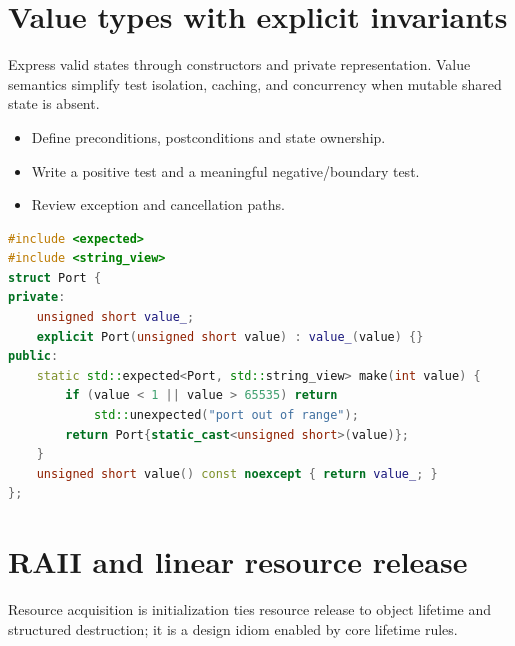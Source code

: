 \documentclass[11pt]{article}
\begin{document}
\section{Value types with explicit invariants}
Express valid states through constructors and private representation. Value semantics simplify test isolation, caching, and concurrency when mutable shared state is absent.

\begin{itemize}[leftmargin=*,itemsep=1pt,topsep=3pt]
\item Define preconditions, postconditions and state ownership.
\item Write a positive test and a meaningful negative/boundary test.
\item Review exception and cancellation paths.
\end{itemize}
\begin{lstlisting}[language=C++]
#include <expected>
#include <string_view>
struct Port {
private:
    unsigned short value_;
    explicit Port(unsigned short value) : value_(value) {}
public:
    static std::expected<Port, std::string_view> make(int value) {
        if (value < 1 || value > 65535) return
            std::unexpected("port out of range");
        return Port{static_cast<unsigned short>(value)};
    }
    unsigned short value() const noexcept { return value_; }
};
\end{lstlisting}
\section{RAII and linear resource release}
Resource acquisition is initialization ties resource release to object lifetime and structured destruction; it is a design idiom enabled by core lifetime rules.
\end{document}
